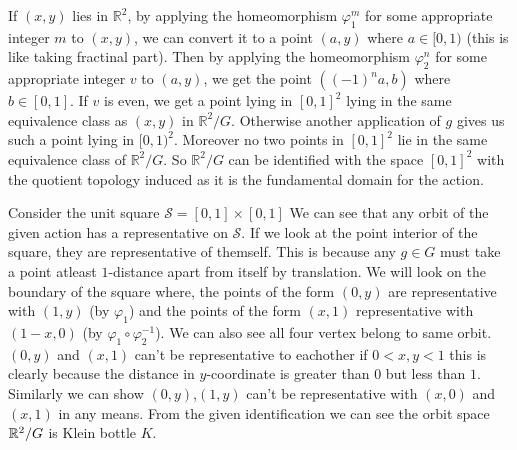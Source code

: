 \documentclass[11pt]{article}
\begin{document}
\vspace*{0.2cm}

\noindent If $(x, y)$ lies in $\mathbb{R}^2$, by applying the homeomorphism $\varphi_1^m$ for some appropriate integer $m$ to $(x, y)$, we can convert it to a point $(a, y)$ where $a \in[0,1)$ (this is like taking fractinal part). Then by applying the homeomorphism $\varphi_2^n$ for some appropriate integer $v$ to $(a, y)$, we get the point $\left((-1)^n a, b\right)$ where $b \in[0,1]$. If $v$ is even, we get a point lying in $[0,1]^2$ lying in the same equivalence class as $(x, y)$ in $\mathbb{R}^2 / G$. Otherwise another application of $g$ gives us such a point lying in $[0,1)^2$. Moreover no two points in $[0,1]^2$ lie in the same equivalence class of $\mathbb{R}^2 / G$. So $\mathbb{R}^2 / G$ can be identified with the space $[0,1]^2$ with the quotient topology induced as it is the fundamental domain for the action. 

\vspace*{0.2cm}

\noindent Consider the unit square $\mathcal{S} = [0,1]\times [0,1]$ We can see that any orbit of the given action has a representative on $\mathcal{S}$. If we look at the point interior of the square, they are representative of themself. This is because any $g \in G$ must take a point atleast $1$-distance apart from itself by translation. We will look on the boundary of the square where, the points of the form $(0,y)$ are representative with $(1,y)$ (by $\varphi_1$) and the points of the form $(x,1)$ representative with $(1-x,0)$ (by $\varphi_1 \circ \varphi_2^{-1}$). We can also see all four vertex belong to same orbit. $(0,y)$ and $(x,1)$ can't be representative to eachother if $0<x,y<1$ this is clearly because the distance in $y$-coordinate is greater than $0$ but less than $1$. Similarly we can show $(0,y)$,$(1,y)$ can't be representative with $(x,0)$ and $(x,1)$ in any means. From the given identification we can see the orbit space $\mathbb{R}^2 /G$ is Klein bottle $K$. 

\vspace*{0.2cm}
\end{document}
